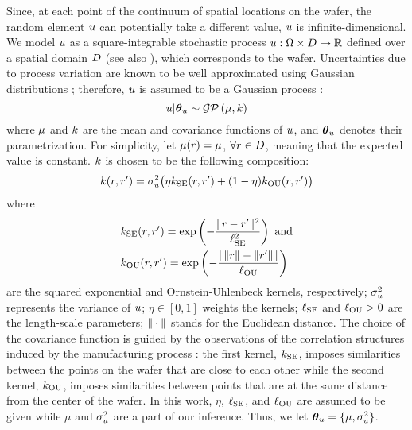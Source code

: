 Since, at each point of the continuum of spatial locations on the wafer, the random element $u$ can potentially take a different value, $u$ is infinite-dimensional.
We model $u$ as a square-integrable stochastic process $u: \Omega \times D \to \mathbb{R}$ defined over a spatial domain $D$ (see also ), which corresponds to the wafer.
Uncertainties due to process variation are known to be well approximated using Gaussian distributions \cite{srivastava2010}; therefore, $u$ is assumed to be a Gaussian process \cite{rasmussen2006}:
\[
  \u | \vparam_\u \sim \gaussianp{\fMean}{\fCov}
\]
where $\fMean$ and $\fCov$ are the mean and covariance functions of $u$, and ${\boldsymbol\theta}_u$ denotes their parametrization. For simplicity, let $\fMean{\r} = \mu$, $\forall r \in D$, meaning that the expected value is constant.
$\fCov$ is chosen to be the following composition:
\begin{equation} \elabel{covariance-function}
  \fCov{\r, \r'} = \sigma_\u^2 \big( \eta \fCov_\SE(\r, \r') + (1 - \eta) \fCov_\OU(\r, \r') \big)
\end{equation}
where
\begin{align*}
  & \fCov_\SE(\r, \r') = \exp\left(-\frac{\norm{\r - \r'}^2}{\ell_\SE^2}\right) \text{ and} \\
  & \fCov_\OU(\r, \r') = \exp\left(- \frac{\abs{\,\norm{\r} - \norm{\r'}\,}}{\ell_\OU} \right)
\end{align*}
are the squared exponential and Ornstein-Uhlenbeck kernels, respectively; $\sigma_u^2$ represents the variance of $u$; $\eta \in [0, 1]$ weights the kernels; $\ell_{\text{SE}}$ and $\ell_{\text{OU}} > 0$ are the length-scale parameters; $\| \cdot \|$ stands for the Euclidean distance.
The choice of the covariance function is guided by the observations of the correlation structures induced by the manufacturing process \cite{cheng2011}: the first kernel, $\fCov_\SE$, imposes similarities between the points on the wafer that are close to each other while the second kernel, $\fCov_\OU$, imposes similarities between points that are at the same distance from the center of the wafer.
In this work, $\eta$, $\ell_{\text{SE}}$, and $\ell_{\text{OU}}$ are assumed to be given while $\mu$ and $\sigma^2_u$ are a part of our inference. Thus, we let ${\boldsymbol\theta}_u = \{ \mu, \sigma_u^2 \}$.

